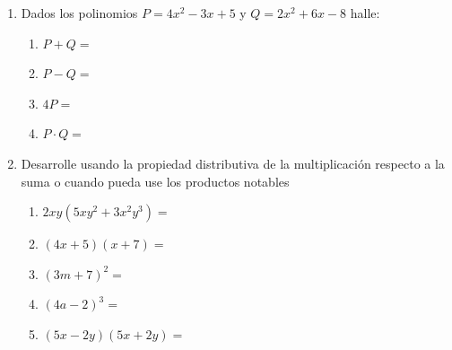 \documentclass[letterpaper,fleqn]{article}
\begin{document}
\begin{enumerate}
\begin{enumerate}
\end{enumerate}
\newpage
\item Dados los polinomios $P=4x^{2}-3x+5$ \hspace{24pt} y \hspace{24pt} $Q=2x^{2}+6x-8$ halle:
\begin{enumerate}
 \item $P+Q=$\noanswer
 \item $P-Q=$\noanswer
 \item $4P=$\noanswer
 \item $P\cdot Q=$\noanswer
\end{enumerate}
\item Desarrolle usando la propiedad distributiva de la multiplicación respecto a la suma o cuando pueda use los productos notables
\begin{enumerate}
 \item $2xy(5xy^{2}+3x^{2}y^{3})=$\noanswer
 \item $(4x+5)(x+7)=$\noanswer
 \item $(3m+7)^{2}=$\noanswer
 \item $(4a-2)^{3}=$\noanswer
 \item $(5x-2y)(5x+2y)=$\noanswer
\end{enumerate}
 \end{enumerate}
\end{document}
